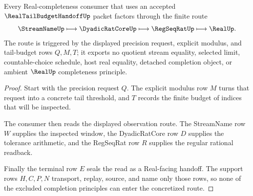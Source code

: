 \begin{theorem}
\label{thm:real-tail-budget-handoff-concretization-route}
Every Real-completeness consumer that uses an accepted $\RealTailBudgetHandoffUp$ packet factors through the finite route
$$
\StreamNameUp \longmapsto
\DyadicRatCoreUp \longmapsto
\RegSeqRatUp \longmapsto
\RealUp .
$$
The route is triggered by the displayed precision request, explicit modulus, and tail-budget rows $Q,M,T$; it exports no quotient stream equality, selected limit, countable-choice schedule, host real equality, detached completion object, or ambient $\RealUp$ completeness principle.
\end{theorem}
\begin{proof}
Start with the precision request $Q$. The explicit modulus row $M$ turns that request into a concrete tail threshold, and $T$ records the finite budget of indices that will be inspected.

The consumer then reads the displayed observation route. The StreamName row $W$ supplies the inspected window, the DyadicRatCore row $D$ supplies the tolerance arithmetic, and the RegSeqRat row $R$ supplies the regular rational readback.

Finally the terminal row $E$ seals the read as a Real-facing handoff. The support rows $H,C,P,N$ transport, replay, source, and name only those rows, so none of the excluded completion principles can enter the concretized route.
\end{proof}




